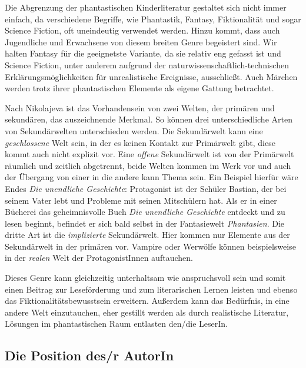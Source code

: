            Die Abgrenzung der phantastischen Kinderliteratur
gestaltet sich nicht immer einfach, da  verschiedene Begriffe, wie Phantastik,
Fantasy, Fiktionalität und sogar Science Fiction, oft uneindeutig verwendet
werden. Hinzu kommt, dass auch Jugendliche und Erwachsene von diesem breiten
Genre begeistert sind. Wir halten Fantasy für die geeignetste Variante, da sie
relativ eng gefasst ist und Science Fiction, unter anderem aufgrund der
naturwissenschaftlich-technischen Erklärungsmöglichkeiten für unrealistische
Ereignisse, ausschließt. Auch Märchen werden trotz ihrer phantastischen Elemente
als eigene Gattung betrachtet.

      Nach Nikolajeva ist das Vorhandensein von zwei Welten, der primären und
      sekundären, das auszeichnende Merkmal. So können drei unterschiedliche
      Arten von Sekundärwelten unterschieden werden. \parencite[176]{Rank2011}
      Die Sekundärwelt kann eine \emph{geschlossene} Welt sein, in der es keinen
      Kontakt zur Primärwelt gibt, diese kommt auch nicht explizit vor. Eine
      \emph{offene} Sekundärwelt ist von der Primärwelt räumlich und zeitlich
      abgetrennt, beide Welten kommen im Werk vor und auch der Übergang von
      einer in die andere kann Thema sein. Ein Beispiel hierfür wäre Endes
      \emph{Die unendliche Geschichte}: Protagonist ist der Schüler Bastian, der
      bei seinem Vater lebt und Probleme mit seinen Mitschülern hat. Als er in
      einer Bücherei das geheimnisvolle Buch \emph{Die unendliche Geschichte}
      entdeckt und zu lesen beginnt, befindet er sich bald selbst in der
      Fantasiewelt \emph{Phantasien}. Die dritte Art ist die \emph{implizierte}
      Sekundärwelt. Hier kommen nur Elemente aus der  Sekundärwelt in der
      primären vor. Vampire oder Werwölfe können beispielsweise in der
      \emph{realen} Welt der ProtagonistInnen auftauchen.

      Dieses Genre kann gleichzeitig unterhaltsam wie anspruchsvoll sein und
      somit einen Beitrag zur Leseförderung und zum literarischen Lernen leisten
      und ebenso das Fiktionalitätsbewusstsein erweitern. Außerdem kann das
      Bedürfnis, in eine andere Welt einzutauchen, eher gestillt werden als
      durch realistische Literatur, Lösungen im phantastischen Raum entlasten
      den/die LeserIn.

  \subsection{Die Position des/r AutorIn}

